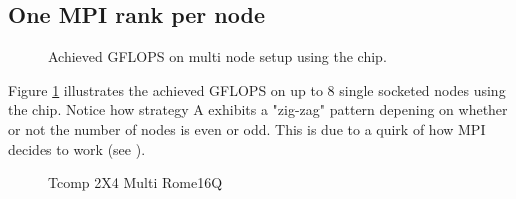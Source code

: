 \subsection{One MPI rank per node}
\begin{figure}[htpb]
    \centering
    \caption{Achieved GFLOPS on multi node setup using the \romeq{} chip.}
    \label{fig:gflopsromemulti}
\end{figure}

Figure \ref{fig:gflopsromemulti} illustrates the achieved GFLOPS on up to 8 single socketed nodes using the \romeq{} chip. Notice how strategy A exhibits a "zig-zag" pattern depening on whether or not the number of nodes is even or odd. This is due to a quirk of how MPI decides to work (see \cite{10064025}).

\begin{figure}[htpb]
    \centering
    \caption{}
    \label{fig:tromemulti}
\end{figure}

\begin{figure}[htpb]
    \centering
    \caption{}
    \label{fig:tcommromemulti}
\end{figure}

\begin{figure}[htpb]
    \centering
    \caption{Tcomp 2X4 Multi Rome16Q}
    \label{fig:tcomp_2x4_multi_rome16q}
\end{figure}


\begin{figure}[htpb]
    \centering
    \caption{}
    \label{fig:commlaoadromemulti}
\end{figure}
